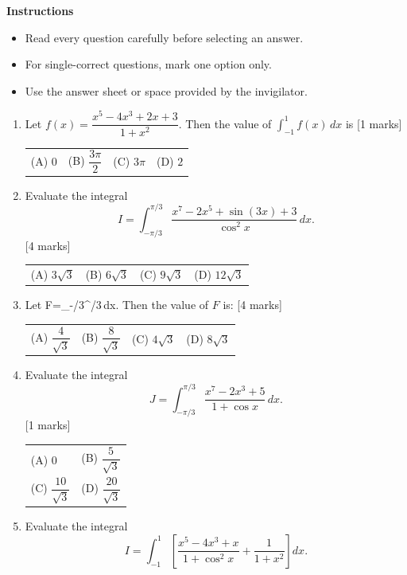 \documentclass[11pt,a4paper]{article}
\begin{document}
\textbf{Instructions}
\begin{itemize}[topsep=2pt]
\item Read every question carefully before selecting an answer.
\item For single-correct questions, mark one option only.
\item Use the answer sheet or space provided by the invigilator.
\end{itemize}
\begin{enumerate}[resume]
\item Let $f(x)=\dfrac{x^5-4x^3+2x+3}{1+x^2}$. Then the value of $\displaystyle\int_{-1}^{1}f(x)\,dx$ is \hfill [1 marks]
{\renewcommand{\arraystretch}{1.8}
\begin{tabularx}{\linewidth}{X X X X}
(A) \quad $0$ & (B) \quad $\dfrac{3\pi}{2}$ & (C) \quad $3\pi$ & (D) \quad $2$ \\[10pt]
\end{tabularx}}
\item Evaluate the integral
\[
I=\int_{-\pi/3}^{\pi/3}\frac{x^7-2x^5+\sin(3x)+3}{\cos^2 x}\,dx.
\] \hfill [4 marks]
{\renewcommand{\arraystretch}{1.8}
\begin{tabularx}{\linewidth}{X X X X}
(A) \quad $3\sqrt{3}$ & (B) \quad $6\sqrt{3}$ & (C) \quad $9\sqrt{3}$ & (D) \quad $12\sqrt{3}$ \\[10pt]
\end{tabularx}}
\item Let \displaystyle F=\int_{-\pi/3}^{\pi/3}\,dx. Then the value of \(F\) is: \hfill [4 marks]
{\renewcommand{\arraystretch}{1.8}
\begin{tabularx}{\linewidth}{X X X X}
(A) \quad \(\dfrac{4}{\sqrt{3}}\) & (B) \quad \(\dfrac{8}{\sqrt{3}}\) & (C) \quad \(4\sqrt{3}\) & (D) \quad \(8\sqrt{3}\) \\[10pt]
\end{tabularx}}
\item Evaluate the integral
\[
J=\int_{-\pi/3}^{\pi/3}\frac{x^{7}-2x^{3}+5}{1+\cos x}\,dx.
\] \hfill [1 marks]
{\renewcommand{\arraystretch}{1.8}
\begin{tabularx}{\linewidth}{X X}
(A) \quad $0$ & (B) \quad $\dfrac{5}{\sqrt{3}}$ \\[10pt]
(C) \quad $\dfrac{10}{\sqrt{3}}$ & (D) \quad $\dfrac{20}{\sqrt{3}}$ \\[10pt]
\end{tabularx}}
\item Evaluate the integral
\[
I=\int_{-1}^{1}\left[\frac{x^5-4x^3+x}{1+\cos^2 x}+\frac{1}{1+x^2}\right]dx.
\]
\end{enumerate}
\end{document}
